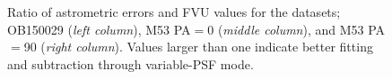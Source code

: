 \documentclass[]{spie}  %
\begin{document}
\begin{figure}[!h]
  \hspace{-1.51cm}
  \caption{\footnotesize Ratio of astrometric errors and FVU values for the datasets; OB150029 (\textit{left column}), M53 PA$=$0 (\textit{middle column}), and M53 PA$=$90 (\textit{right column}). Values larger than one indicate better fitting and subtraction through variable-PSF mode.} \label{fig:ob-m53-astromfvu-ratios}
\end{figure}
\end{document}
